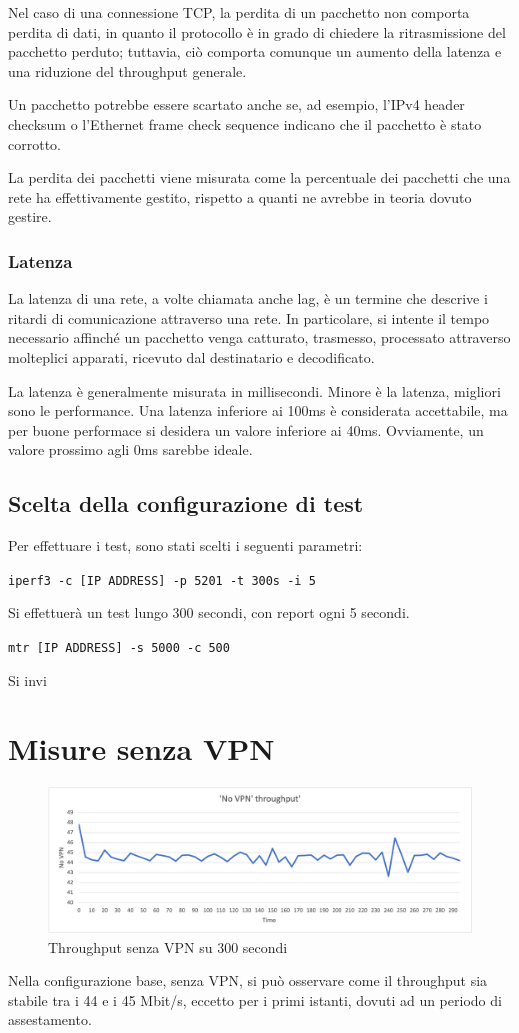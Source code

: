 Nel caso di una connessione TCP, la perdita di un pacchetto non comporta perdita di dati, in quanto il protocollo è in grado di chiedere la ritrasmissione del pacchetto perduto; tuttavia, ciò comporta comunque un aumento della latenza e una riduzione del throughput generale.

Un pacchetto potrebbe essere scartato anche se, ad esempio, l'IPv4 header checksum o l'Ethernet frame check sequence indicano che il pacchetto è stato corrotto.

La perdita dei pacchetti viene misurata come la percentuale dei pacchetti che una rete ha effettivamente gestito, rispetto a quanti ne avrebbe in teoria dovuto gestire.


\subsubsection{Latenza}
La latenza di una rete, a volte chiamata anche lag, è un termine che descrive i ritardi di comunicazione attraverso una rete. In particolare, si intente il tempo necessario affinché un pacchetto venga catturato, trasmesso, processato attraverso molteplici apparati, ricevuto dal destinatario e decodificato.

La latenza è generalmente misurata in millisecondi. Minore è la latenza, migliori sono le performance. Una latenza inferiore ai 100ms è considerata accettabile, ma per buone performace si desidera un valore inferiore ai 40ms. Ovviamente, un valore prossimo agli 0ms sarebbe ideale.

\subsection{Scelta della configurazione di test}
Per effettuare i test, sono stati scelti i seguenti parametri:


\texttt{iperf3 -c [IP ADDRESS] -p 5201 -t 300s -i 5}


Si effettuerà un test lungo 300 secondi, con report ogni 5 secondi.

\texttt{mtr [IP ADDRESS] -s 5000 -c 500}


Si invi

\section{Misure senza VPN}
\begin{figure}[ht]
    \centering
    \includegraphics[width=12cm]{figure/vpn_thr.png-1.png}
    \caption{Throughput senza VPN su 300 secondi}
\end{figure}
Nella configurazione base, senza VPN, si può osservare come il throughput sia stabile tra i 44 e i 45 Mbit/s, eccetto per i primi istanti, dovuti ad un periodo di assestamento.

